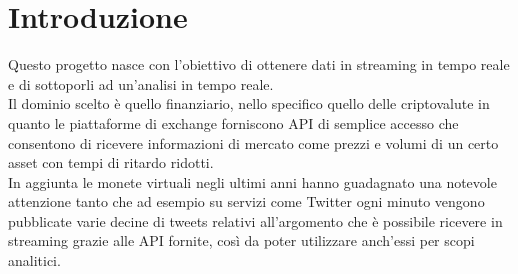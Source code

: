 \section{Introduzione}

Questo progetto nasce con l'obiettivo di ottenere dati in streaming in tempo reale e di sottoporli
ad un'analisi
in tempo reale.\\
Il dominio scelto è quello finanziario, nello specifico quello delle criptovalute in
quanto le piattaforme di exchange forniscono API di semplice accesso che consentono di ricevere
informazioni di mercato come prezzi e volumi di un certo asset con tempi di ritardo ridotti.\\
In aggiunta le monete virtuali negli ultimi anni hanno guadagnato una notevole attenzione
tanto che ad esempio su servizi come Twitter ogni minuto vengono pubblicate varie decine di tweets
relativi all'argomento che è possibile ricevere in streaming grazie alle API fornite, così da poter utilizzare anch'essi per scopi analitici.